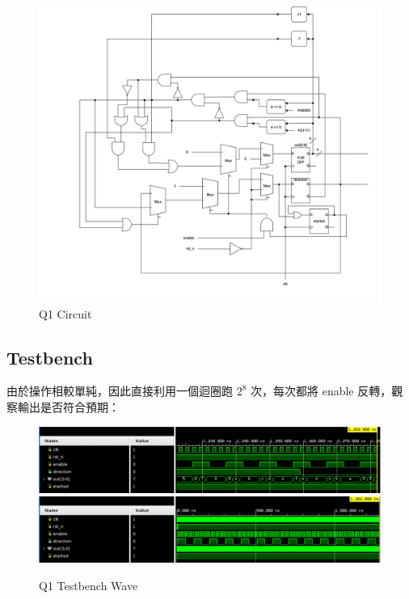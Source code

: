 \documentclass[10.5pt,compsoc,UTF8]{CjC}
\theoremstyle{mystyle}
\begin{document}
\begin{figure}[!h]
  \centering
  \includegraphics[width=\textwidth]{./img/Q1.png}
  \caption{Q1 Circuit}
  \label{fig:Q1}
\end{figure}

\newpage

\subsection{Testbench}
由於操作相較單純，因此直接利用一個迴圈跑 $2^8$ 次，每次都將 enable 反轉，觀察輸出是否符合預期：

\begin{figure}[!h]
  \centering
  \includegraphics[width=\textwidth]{./img/Q1-tb-wave1.png}
  \includegraphics[width=\textwidth]{./img/Q1-tb-wave2.png}
  \caption{Q1 Testbench Wave}
  \label{fig:Q1-tb}
\end{figure}
\end{document}
